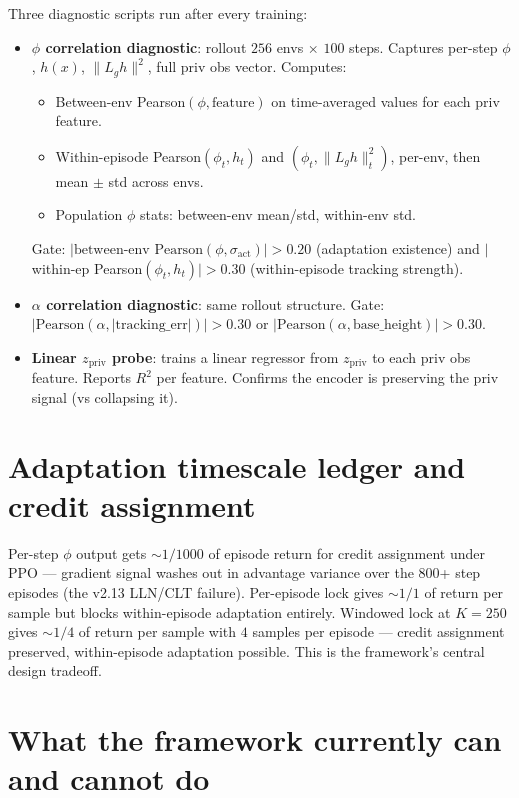 \documentclass[11pt]{article}
\begin{document}
Three diagnostic scripts run after every training:

\begin{itemize}
\item \textbf{$\phi$ correlation diagnostic}: rollout $256$ envs $\times$ $100$ steps. Captures per-step $\phi$, $h(x)$, $\|L_g h\|^2$, full priv obs vector. Computes:
  \begin{itemize}
  \item Between-env Pearson$(\phi, \text{feature})$ on time-averaged values for each priv feature.
  \item Within-episode Pearson$(\phi_t, h_t)$ and $(\phi_t, \|L_g h\|^2_t)$, per-env, then mean $\pm$ std across envs.
  \item Population $\phi$ stats: between-env mean/std, within-env std.
  \end{itemize}
  Gate: $|\text{between-env Pearson}(\phi, \sigma_\text{act})| > 0.20$ (adaptation existence) and $|$within-ep Pearson$(\phi_t, h_t)| > 0.30$ (within-episode tracking strength).
\item \textbf{$\alpha$ correlation diagnostic}: same rollout structure. Gate: $|\text{Pearson}(\alpha, |\text{tracking\_err}|)| > 0.30$ or $|\text{Pearson}(\alpha, \text{base\_height})| > 0.30$.
\item \textbf{Linear $z_\text{priv}$ probe}: trains a linear regressor from $z_\text{priv}$ to each priv obs feature. Reports $R^2$ per feature. Confirms the encoder is preserving the priv signal (vs collapsing it).
\end{itemize}

\section*{Adaptation timescale ledger and credit assignment}

Per-step $\phi$ output gets $\sim 1/1000$ of episode return for credit assignment under PPO — gradient signal washes out in advantage variance over the $800$+ step episodes (the v2.13 LLN/CLT failure). Per-episode lock gives $\sim 1/1$ of return per sample but blocks within-episode adaptation entirely. Windowed lock at $K{=}250$ gives $\sim 1/4$ of return per sample with $4$ samples per episode — credit assignment preserved, within-episode adaptation possible. This is the framework's central design tradeoff.

\section*{What the framework currently can and cannot do}
\end{document}
